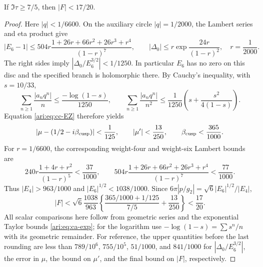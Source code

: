 \begin{proposition}\label{ari:C.8.13}
If $\Im\tau\ge7/5$, then $|F|<17/20$.
\end{proposition}
\begin{proof}
Here $|q|<1/6600$. On the auxiliary circle $|q|=1/2000$,
the Lambert series and eta product give
\[
 |E_6-1|\le
 504r\frac{1+26r+66r^2+26r^3+r^4}{(1-r)^7},\qquad
 |\Delta_0|\le r\exp\!\frac{24r}{(1-r)^2},
 \quad r=\frac1{2000}.
\]
The right sides imply $|\Delta_0/E_6^{3/2}|<1/1250$.
In particular $E_6$ has no zero on this disc and the specified
branch is holomorphic there. By Cauchy's inequality, with
$s=10/33$,
\[
 \sum_{n\ge1}\frac{|a_nq^n|}{n}
 \le\frac{-\log(1-s)}{1250},\qquad
 \sum_{n\ge1}\frac{|a_nq^n|}{n^2}
 \le\frac1{1250}\left(s+\frac{s^2}{4(1-s)}\right).
\]
Equation \eqref{ari:eq:cc-EZ} therefore yields
\[
 |\mu-(1/2-i\beta_{\rm cusp})|<\frac1{125},\qquad
 |\mu'|<\frac{13}{250},\qquad \beta_{\rm cusp}<\frac{365}{1000}.
\]
For $r=1/6600$, the corresponding weight-four and weight-six
Lambert bounds are
\[
 240r\frac{1+4r+r^2}{(1-r)^5}<\frac{37}{1000},\qquad
 504r\frac{1+26r+66r^2+26r^3+r^4}{(1-r)^7}
       <\frac{77}{1000}.
\]
Thus $|E_4|>963/1000$ and $|E_6|^{1/2}<1038/1000$.
Since $6\pi|p/g_2|=\sqrt6|E_6|^{1/2}/|E_4|$,
\begin{equation}\label{ari:eq:cc-cuspbound}
 |F|<\sqrt6\frac{1038}{963}
 \left\{\frac{365/1000+1/125}{7/5}+\frac{13}{250}\right\}
 <\frac{17}{20}.
\end{equation}
All scalar comparisons here follow from geometric series and
the exponential Taylor bounds \eqref{ari:eq:ca-exp}; for the logarithm
use $-\log(1-s)=\sum s^n/n$ with its geometric remainder.
For reference, the upper quantities before the last rounding are
less than $789/10^6$, $755/10^5$, $51/1000$, and $841/1000$
for $|\Delta_0/E_6^{3/2}|$, the error in $\mu$, the bound on
$\mu'$, and the final bound on $|F|$, respectively.
\end{proof}

